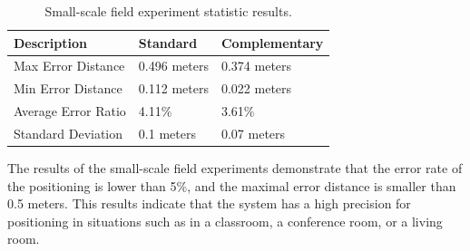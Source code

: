 \begin{table}
\begin{center}
\vspace{-35pt}
    \begin{tabular}{ | l | l | l |}
    \hline
    Description & Standard & Complementary \\ \hline\hline
    Max Error Distance & 0.496 meters & 0.374 meters \\ \hline
    Min Error Distance & 0.112 meters & 0.022 meters \\ \hline
    Average Error Ratio & 4.11\% & 3.61\% \\ \hline
    Standard Deviation & 0.1 meters & 0.07 meters \\ \hline
    \end{tabular}
\end{center}
\vspace{-15pt}
\caption{Small-scale field experiment statistic results.}\label{tb-small-scale-analysis}
\vspace{-15pt}
\end{table} 
The results of the small-scale field experiments demonstrate that the error rate of the positioning is lower than 5\%, and the maximal error distance is smaller than 0.5 meters. This results indicate that the system has a high precision for positioning in situations such as in a classroom, a conference room, or a living room.
